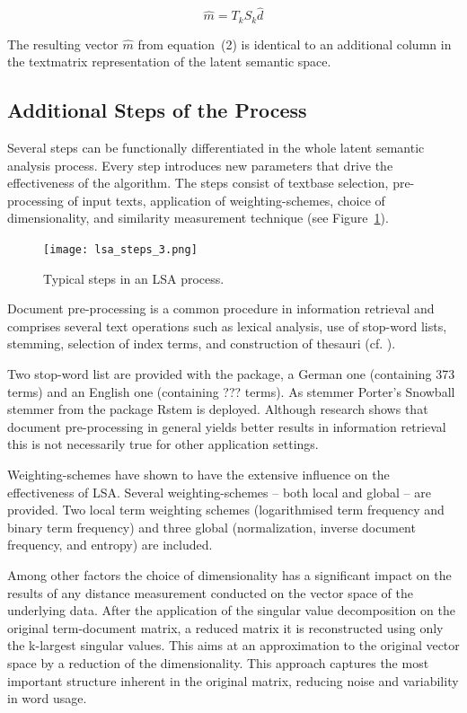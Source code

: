 \documentclass[article]{jss}
\begin{document}
\begin{equation}\hat{m} = T_{k} S_{k} \hat{d}\end{equation}

The resulting vector
\begin{math}\hat{m}\end{math} from equation~(2) is identical to an additional column in the
textmatrix representation of the latent semantic space.

\subsection{Additional Steps of the Process}

Several steps can be functionally differentiated in
the whole latent semantic analysis process. Every step
introduces new parameters that drive the effectiveness
of the algorithm. The steps consist of textbase selection,
pre-processing of input texts, application of weighting-schemes, 
choice of dimensionality, and similarity measurement technique (see 
Figure~\ref{fig:steps}).

\begin{figure}\label{fig:steps}
  \centering
  \texttt{[image: lsa\_steps\_3.png]}
  \caption{Typical steps in an LSA process.}
\end{figure}

Document pre-processing is a common procedure in information retrieval and 
comprises several text operations such as lexical analysis, use of stop-word 
lists, stemming, selection of index terms, and construction of thesauri (cf. \cite{baezayates:1999}).
 
Two stop-word list are provided with the package, a German one (containing 373 terms)
and an English one (containing ??? terms). As stemmer Porter's Snowball stemmer from
the package Rstem is deployed. Although research shows that document pre-processing 
in general yields better results in information retrieval this is not necessarily 
true for other application settings.

Weighting-schemes have shown to have the extensive influence on the effectiveness 
of LSA. Several weighting-schemes -- both local and global -- are provided. Two local 
term weighting schemes (logarithmised term frequency and binary term frequency) and 
three global (normalization, inverse document frequency, and entropy) are included.

Among other factors the choice of dimensionality has a significant impact on the 
results of any distance measurement conducted on the vector space of the 
underlying data. After the application of the singular value decomposition on 
the original term-document matrix, a reduced matrix it is reconstructed using only 
the k-largest singular values. This aims at an approximation to the original vector 
space by a reduction of the dimensionality. This approach captures the most important 
structure inherent in the original matrix, reducing noise and variability in 
word usage.
\end{document}
